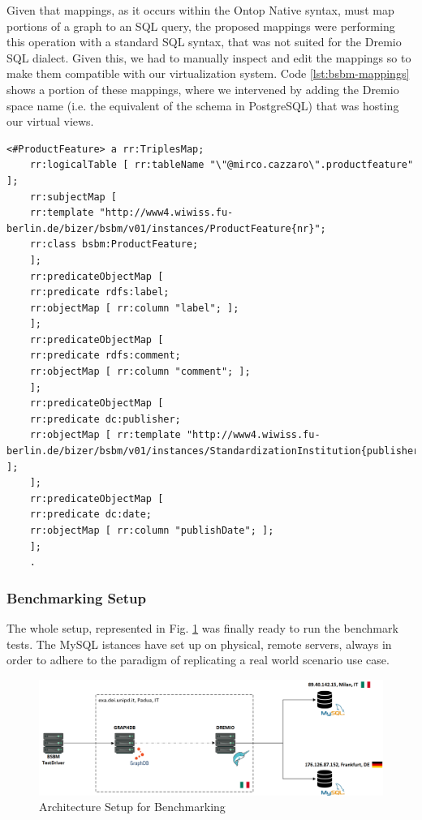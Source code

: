 Given that mappings, as it occurs within the Ontop Native syntax, must map portions of a graph to an \ac{SQL} query, the proposed mappings were performing this operation with a standard \ac{SQL} syntax, that was not suited for the Dremio \ac{SQL} dialect. Given this, we had to manually inspect and edit the mappings so to make them compatible with our virtualization system. Code \ref{lst:bsbm-mappings} shows a portion of these mappings, where we intervened by adding the Dremio space name (i.e. the equivalent of the schema in PostgreSQL) that was hosting our virtual views.
\begin{lstlisting}[language=R2RML, caption={BSBM Custom Mappings for Dremio \ac{SQL} Syntax in R2RML}, label={lst:bsbm-mappings}]
    <#ProductFeature> a rr:TriplesMap;
    rr:logicalTable [ rr:tableName "\"@mirco.cazzaro\".productfeature" ];
    rr:subjectMap [
    rr:template "http://www4.wiwiss.fu-berlin.de/bizer/bsbm/v01/instances/ProductFeature{nr}";
    rr:class bsbm:ProductFeature;
    ];
    rr:predicateObjectMap [
    rr:predicate rdfs:label;
    rr:objectMap [ rr:column "label"; ];
    ];
    rr:predicateObjectMap [
    rr:predicate rdfs:comment;
    rr:objectMap [ rr:column "comment"; ];
    ];
    rr:predicateObjectMap [
    rr:predicate dc:publisher;
    rr:objectMap [ rr:template "http://www4.wiwiss.fu-berlin.de/bizer/bsbm/v01/instances/StandardizationInstitution{publisher}"; ];
    ];
    rr:predicateObjectMap [
    rr:predicate dc:date;
    rr:objectMap [ rr:column "publishDate"; ];
    ];
    .
\end{lstlisting}

\subsubsection{Benchmarking Setup}
The whole setup, represented in Fig. \ref{fig:benchmark-setup} was finally ready to run the benchmark tests. The MySQL istances have set up on physical, remote servers, always in order to adhere to the paradigm of replicating a real world scenario use case.
\begin{figure}[ht]
    \centering
    \includegraphics[width=16cm]{res/benchmark-setup.png}
    \caption{Architecture Setup for Benchmarking}
    \label{fig:benchmark-setup}
\end{figure}

